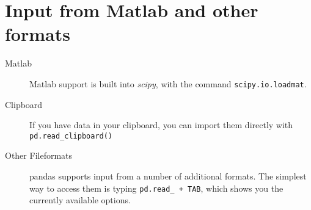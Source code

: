 \section{Input from Matlab and other formats}

\begin{description}
  \item[Matlab] Matlab support is built into \emph{scipy}, with the command \lstinline{scipy.io.loadmat}.
  \item[Clipboard] If you have data in your clipboard, you can import them directly with \lstinline{pd.read_clipboard()}
  \item[Other Fileformats] pandas supports input from a number of additional formats. The simplest way to access them is typing \lstinline{pd.read_ + TAB}, which shows you the currently available options.
\end{description}
